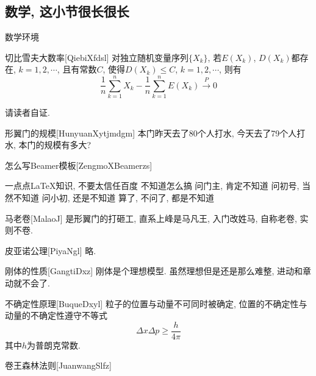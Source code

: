\documentclass[hyperref, UTF8, CJK, aspectratio=169]{beamer}
\begin{document}
\subsection{数学, 这小节很长很长}
\begin{frame}{数学环境}
	\begin{scutheorem}{切比雪夫大数率}[QiebiXfdsl]
		对独立随机变量序列$\{X_k\}$, 若$E(X_k)$, $D(X_k)$都存在, $k=1,2,\cdots$, 且有常数$C$, 使得$D(X_k)\leq C$, $k=1,2,\cdots$, 则有
		\begin{equation}
		\dfrac{1}{n} \sum_{k=1}^{n} X_k - \dfrac{1}{n} \sum_{k=1}^{n} E(X_k) \stackrel{\;P\;}{\longrightarrow} 0
		\end{equation}
	\end{scutheorem}
	\begin{scuproof}{}
		请读者自证.
	\end{scuproof}
	\begin{scuexample}{形翼门的规模}[HunyuanXytjmdgm]
		本门昨天去了80个人打水, 今天去了79个人打水, 本门的规模有多大?
	\end{scuexample}
	\begin{scualgorithm}{怎么写Beamer模板}[ZengmoXBeamerzs]
		\begin{algorithmic}[1]
			\REQUIRE 一点点\LaTeX 知识, 不要太信任百度
			\ENSURE 不知道怎么搞
			\STATE 问门主, 肯定不知道
			\STATE 问初号, 当然不知道
			\STATE 问小初, 还是不知道
			\RETURN 算了, 不问了, 都是不知道
		\end{algorithmic}
	\end{scualgorithm}
	\begin{scudefinition}{马老卷}[MalaoJ]
		是形翼门的打砸工, 直系上峰是马凡王, 入门改姓马, 自称老卷, 实则不卷.
	\end{scudefinition}
	\begin{scuaxiom}{皮亚诺公理}[PiyaNgl]
		略.
	\end{scuaxiom}
	\begin{scuproperty}{刚体的性质}[GangtiDxz]
		刚体是个理想模型. 虽然理想但是还是那么难整, 进动和章动就不会了.
	\end{scuproperty}
	\begin{scuproposition}{不确定性原理}[BuqueDxyl]
		粒子的位置与动量不可同时被确定, 位置的不确定性与动量的不确定性遵守不等式
		\begin{equation}
		\Delta x \Delta p \geq \dfrac{h}{4\pi}
		\end{equation}
		其中$h$为普朗克常数.
	\end{scuproposition}
	\begin{sculemma}{卷王森林法则}[JuanwangSlfz]

\end{sculemma}
\end{frame}
\end{document}
